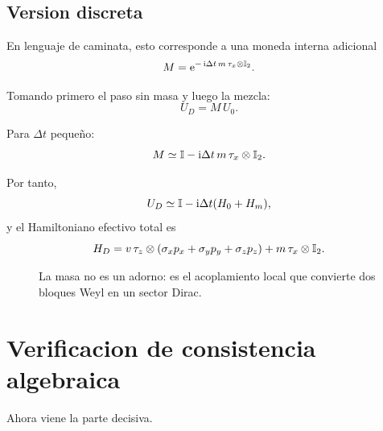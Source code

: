 \subsection{Version discreta}
En lenguaje de caminata, esto corresponde a una moneda interna adicional
\begin{equation}
M = \mathrm{e}^{-\,\mathrm{i} \Delta t\,m\,\tau_x\otimes \mathbb{I}_2}.
\label{c08:eq:M}
\end{equation}

Tomando primero el paso sin masa y luego la mezcla:
\begin{equation}
U_D = M\,U_0.
\label{c08:eq:UD}
\end{equation}

Para \(\Delta t\) peque\~no:
\begin{equation}
M \simeq \mathbb{I} - \mathrm{i} \Delta t\,m\,\tau_x\otimes\mathbb{I}_2.
\end{equation}

Por tanto,
\begin{equation}
U_D \simeq \mathbb{I} - \mathrm{i} \Delta t(H_0+H_m),
\end{equation}
y el Hamiltoniano efectivo total es
\begin{equation}
H_D = v\,\tau_z\otimes(\sigma_x p_x+\sigma_y p_y+\sigma_z p_z)
+ m\,\tau_x\otimes \mathbb{I}_2.
\label{c08:eq:HD}
\end{equation}

\begin{figure}[h!]
\centering
{}
\caption{La masa no es un adorno: es el acoplamiento local que convierte dos bloques Weyl en un sector Dirac.}
\end{figure}

\section{Verificacion de consistencia algebraica}
Ahora viene la parte decisiva.

